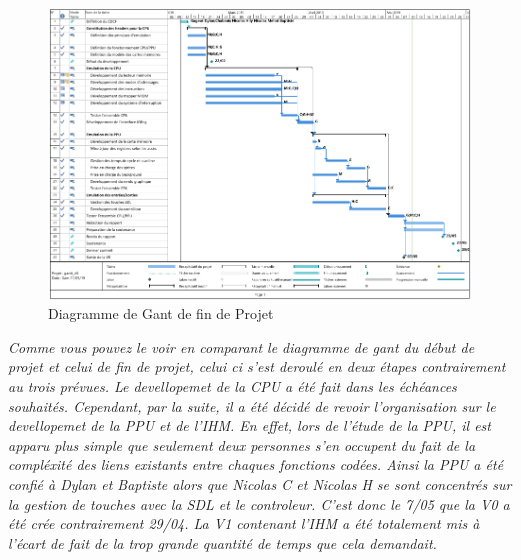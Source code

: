 \begin{figure}[h]
   \includegraphics[scale=0.45]{GantV2.png}
   \caption{\label{étiquette} Diagramme de Gant de fin de Projet}
\end{figure}

\emph{  Comme vous pouvez le voir en comparant le diagramme de gant du début de projet et celui de fin de projet, celui ci s'est deroulé en deux étapes contrairement au trois prévues. Le devellopemet de la CPU a été fait dans les échéances souhaités. Cependant, par la suite, il a été décidé de revoir l'organisation sur le devellopemet de la PPU et de l'IHM. En effet, lors de l'étude de la PPU, il est apparu plus simple que seulement deux personnes s'en occupent du fait de la compléxité des liens existants entre chaques fonctions codées. Ainsi la PPU a été confié à Dylan et Baptiste alors que Nicolas C et Nicolas H se sont concentrés sur la gestion de touches avec la SDL et le controleur. C'est donc le 7/05 que la V0 a été crée contrairement 29/04. La V1 contenant l'IHM a été totalement mis à l'écart de fait de la trop grande quantité de temps que cela demandait.}
